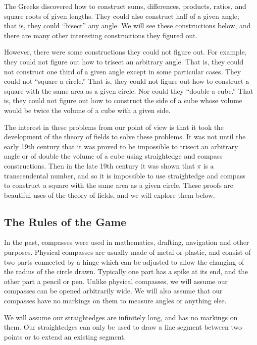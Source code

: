 \documentclass[11pt]{article}
\theoremstyle{definition}
\begin{document}
The Greeks discovered how to construct sums, differences, products, ratios, and square roots of given lengths. They could also construct half of a 
given angle; that is, they could ``bisect'' any angle. We will see these constructions below, and there are many other interesting constructions
they figured out.

However, there were some constructions they could not figure out. For example, they could not figure out how to trisect an arbitrary angle. That is, they could
not construct one third of a given angle except in some particular cases. They could not ``square a circle.'' That is, they could not figure out how to 
construct a square with the same area as a given circle.  Nor could they ``double a cube.'' That is, they could not figure out how to construct the 
side of a cube whose volume would be twice the volume of a cube with a given side.

The interest in these problems from our point of view is that it took the development of the theory of fields to solve these problems. It was not until
the early 19th century that it was proved to be impossible to trisect an arbitrary angle or of double the volume of a cube using straightedge and compass constructions. 
Then in the late 19th century it was shown that $\pi$ is a transcendental number, and so it is impossible to use straightedge and compass 
to construct a square with the same area as a given circle. These proofs are beautiful uses of the theory of fields, and we will
explore them below.

\subsection{The Rules of the Game}

In the past, compasses were used in mathematics, drafting, navigation and other purposes. Physical compasses are usually made of metal or 
plastic, and consist of two parts connected by a hinge which can be adjusted to allow the changing of the radius of the circle drawn. Typically 
one part has a spike at its end, and the other part a pencil or pen. Unlike physical compasses, we will assume our compasses can be opened arbitrarily 
wide. We will also assume that our compasses have no markings on them to measure angles or anything else. 

We will assume our straightedges are infinitely long, and has no markings on them. Our straightedges can only be used to draw a line segment between 
two points or to extend an existing segment.  
\end{document}
